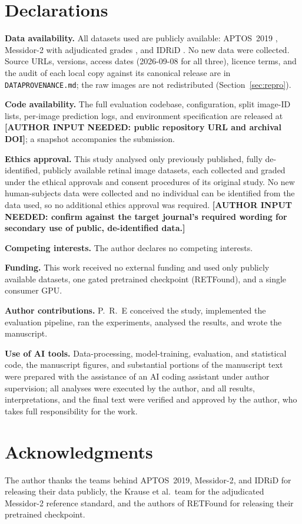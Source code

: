 \documentclass[journal]{IEEEtran}
\renewcommand{\_}{\origunderscore\allowbreak}
\begin{document}
\section*{Declarations}

\textbf{Data availability.} All datasets used are publicly available: APTOS~2019
\cite{aptos2019}, Messidor-2 \cite{decenciere2014,abramoff2013} with adjudicated
grades \cite{krause2018}, and IDRiD \cite{porwal2018,porwal2020}. No new data were
collected. Source URLs, versions, access dates (2026-09-08 for all three),
licence terms, and the audit of each local copy against its canonical release
are in \texttt{DATA\_PROVENANCE.md}; the raw images are not redistributed
(Section~\ref{sec:repro}).

\textbf{Code availability.} The full evaluation codebase, configuration, split
image-ID lists, per-image prediction logs, and environment specification are
released at \textbf{[AUTHOR INPUT NEEDED: public repository URL and archival
DOI]}; a snapshot accompanies the submission.

\textbf{Ethics approval.} This study analysed only previously published, fully
de-identified, publicly available retinal image datasets, each collected and
graded under the ethical approvals and consent procedures of its original study.
No new human-subjects data were collected and no individual can be identified from
the data used, so no additional ethics approval was required.
\textbf{[AUTHOR INPUT NEEDED: confirm against the target journal's required
wording for secondary use of public, de-identified data.]}

\textbf{Competing interests.} The author declares no competing interests.

\textbf{Funding.} This work received no external funding and used only publicly
available datasets, one gated pretrained checkpoint (RETFound), and a single
consumer GPU.

\textbf{Author contributions.} P.\ R.\ E conceived the study, implemented the
evaluation pipeline, ran the experiments, analysed the results, and wrote the
manuscript.

\textbf{Use of AI tools.} Data-processing, model-training, evaluation, and
statistical code, the manuscript figures, and substantial portions of the manuscript text
were prepared with the assistance of an AI coding assistant under author
supervision; all analyses were executed by the author, and all results,
interpretations, and the final text were verified and approved by the author, who
takes full responsibility for the work.

\section*{Acknowledgments}
The author thanks the teams behind APTOS~2019, Messidor-2, and IDRiD for
releasing their data publicly, the Krause et al.\ team for the adjudicated
Messidor-2 reference standard, and the authors of RETFound for releasing their
pretrained checkpoint.



\end{document}

